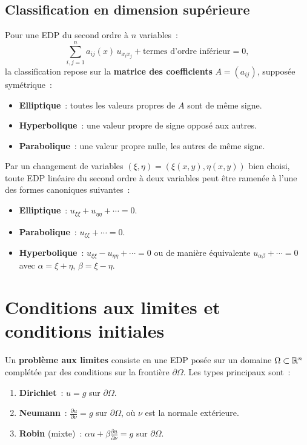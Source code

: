 \subsection{Classification en dimension sup\'erieure}

Pour une EDP du second ordre \`a $n$ variables~:
\[
    \sum_{i,j=1}^{n} a_{ij}(x)\, u_{x_i x_j}
    + \text{termes d'ordre inf\'erieur} = 0,
\]
la classification repose sur la \textbf{matrice des coefficients}
$A = (a_{ij})$, suppos\'ee sym\'etrique~:
\begin{itemize}
    \item \textbf{Elliptique}~: toutes les valeurs propres de $A$ sont de m\^eme signe.
    \item \textbf{Hyperbolique}~: une valeur propre de signe oppos\'e aux autres.
    \item \textbf{Parabolique}~: une valeur propre nulle, les autres de m\^eme signe.
\end{itemize}

\begin{theoreme}[Forme canonique --- cas $n=2$]
Par un changement de variables $(\xi, \eta) = (\xi(x,y), \eta(x,y))$
bien choisi, toute EDP lin\'eaire du second ordre \`a deux variables peut
\^etre ramen\'ee \`a l'une des formes canoniques suivantes~:
\begin{itemize}
    \item \textbf{Elliptique}~: $u_{\xi\xi} + u_{\eta\eta} + \cdots = 0$.
    \item \textbf{Parabolique}~: $u_{\xi\xi} + \cdots = 0$.
    \item \textbf{Hyperbolique}~: $u_{\xi\xi} - u_{\eta\eta} + \cdots = 0$
          ou de mani\`ere \'equivalente $u_{\alpha\beta} + \cdots = 0$ avec
          $\alpha = \xi + \eta$, $\beta = \xi - \eta$.
\end{itemize}
\end{theoreme}

\section{Conditions aux limites et conditions initiales}

\begin{definition}
Un \textbf{probl\`eme aux limites} consiste en une EDP pos\'ee sur un domaine
$\Omega \subset \mathbb{R}^n$ compl\'et\'ee par des conditions sur la fronti\`ere
$\partial\Omega$. Les types principaux sont~:
\begin{enumerate}
    \item \textbf{Dirichlet}~: $u = g$ sur $\partial\Omega$.
    \item \textbf{Neumann}~: $\frac{\partial u}{\partial \nu} = g$ sur
          $\partial\Omega$, o\`u $\nu$ est la normale ext\'erieure.
    \item \textbf{Robin} (mixte)~: $\alpha u + \beta \frac{\partial u}{\partial \nu} = g$
          sur $\partial\Omega$.
\end{enumerate}
\end{definition}

